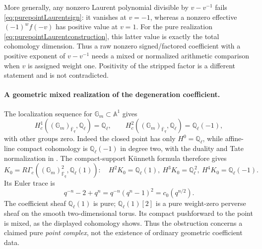 More generally, any nonzero Laurent polynomial divisible by
\(v-v^{-1}\) fails \eqref{eq:purepointLaurentsign}:
it vanishes at \(v=-1\), whereas a nonzero effective
\((-1)^wf(-v)\) has positive value at \(v=1\).
For the pure realization
\eqref{eq:purepointLaurentconstruction}, this latter value
is exactly the total cohomology dimension.
Thus a raw nonzero signed/factored coefficient with a
positive exponent of \(v-v^{-1}\) needs a mixed or
normalized arithmetic comparison when \(v\) is assigned
weight one. Positivity of the stripped factor is a
different statement and is not contradicted.

\paragraph{A geometric mixed realization of the degeneration coefficient.}
The localization sequence for
\(\mathbb G_m\subset\mathbb A^1\)
\cite[Proposition~18.4(b), pp.~121--122]{Milne} gives
\[
 H_c^1((\mathbb G_m)_{\overline{\mathbb F}_q},
          \mathbb Q_\ell)=\mathbb Q_\ell,\qquad
 H_c^2((\mathbb G_m)_{\overline{\mathbb F}_q},
          \mathbb Q_\ell)=\mathbb Q_\ell(-1),
\]
with other groups zero. Indeed the closed point has
only \(H^0=\mathbb Q_\ell\), while affine-line compact
cohomology is \(\mathbb Q_\ell(-1)\) in degree two,
with the duality and Tate normalization in
\cite[Theorem~24.1(a),(b), p.~144]{Milne}.
The compact-support K\"unneth formula
\cite[Theorem~22.1 and Remark~22.3(b),
pp.~135--136]{Milne} therefore gives
\[
 K_0=R\Gamma_c((\mathbb G_m)^2_{\overline{\mathbb F}_q},
                   \mathbb Q_\ell(1)):
 \quad
 H^2K_0=\mathbb Q_\ell(1),\
 H^3K_0=\mathbb Q_\ell^{\,2},\
 H^4K_0=\mathbb Q_\ell(-1).
\]
Its Euler trace is
\[
                  q^{-n}-2+q^n
                  =q^{-n}(q^n-1)^2
                  =c_0(q^{n/2}).
\]
The coefficient sheaf \(\mathbb Q_\ell(1)\) is pure;
\(\mathbb Q_\ell(1)[2]\) is a pure weight-zero perverse
sheaf on the smooth two-dimensional torus.
Its compact pushforward to the point is mixed, as the
displayed cohomology shows. Thus the obstruction concerns
a claimed pure \emph{point complex}, not the existence
of ordinary geometric coefficient data.

